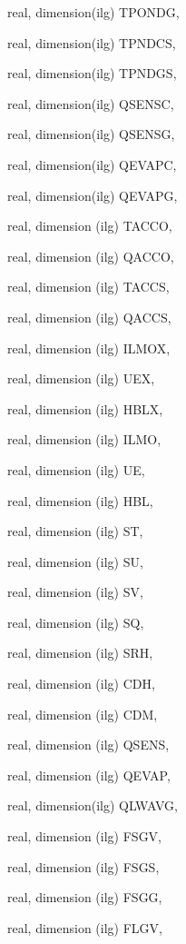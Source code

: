 {\begin{DoxyParamCaption}
\item[{real, dimension(ilg)}]{T\+P\+O\+N\+D\+G, }
\item[{real, dimension(ilg)}]{T\+P\+N\+D\+C\+S, }
\item[{real, dimension(ilg)}]{T\+P\+N\+D\+G\+S, }
\item[{real, dimension(ilg)}]{Q\+S\+E\+N\+S\+C, }
\item[{real, dimension(ilg)}]{Q\+S\+E\+N\+S\+G, }
\item[{real, dimension(ilg)}]{Q\+E\+V\+A\+P\+C, }
\item[{real, dimension(ilg)}]{Q\+E\+V\+A\+P\+G, }
\item[{real, dimension (ilg)}]{T\+A\+C\+C\+O, }
\item[{real, dimension (ilg)}]{Q\+A\+C\+C\+O, }
\item[{real, dimension (ilg)}]{T\+A\+C\+C\+S, }
\item[{real, dimension (ilg)}]{Q\+A\+C\+C\+S, }
\item[{real, dimension (ilg)}]{I\+L\+M\+O\+X, }
\item[{real, dimension   (ilg)}]{U\+E\+X, }
\item[{real, dimension  (ilg)}]{H\+B\+L\+X, }
\item[{real, dimension  (ilg)}]{I\+L\+M\+O, }
\item[{real, dimension    (ilg)}]{U\+E, }
\item[{real, dimension   (ilg)}]{H\+B\+L, }
\item[{real, dimension    (ilg)}]{S\+T, }
\item[{real, dimension    (ilg)}]{S\+U, }
\item[{real, dimension    (ilg)}]{S\+V, }
\item[{real, dimension    (ilg)}]{S\+Q, }
\item[{real, dimension   (ilg)}]{S\+R\+H, }
\item[{real, dimension   (ilg)}]{C\+D\+H, }
\item[{real, dimension   (ilg)}]{C\+D\+M, }
\item[{real, dimension (ilg)}]{Q\+S\+E\+N\+S, }
\item[{real, dimension (ilg)}]{Q\+E\+V\+A\+P, }
\item[{real, dimension(ilg)}]{Q\+L\+W\+A\+V\+G, }
\item[{real, dimension  (ilg)}]{F\+S\+G\+V, }
\item[{real, dimension  (ilg)}]{F\+S\+G\+S, }
\item[{real, dimension  (ilg)}]{F\+S\+G\+G, }
\item[{real, dimension  (ilg)}]{F\+L\+G\+V, }

\end{DoxyParamCaption}}

